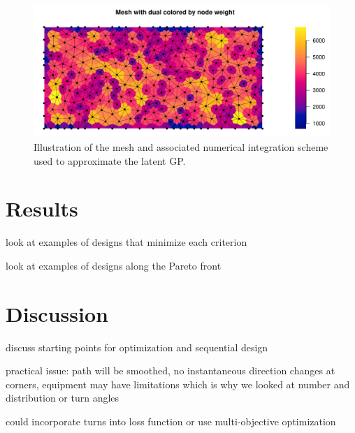 \documentclass[review]{elsarticle}
\begin{document}
\begin{figure}
\includegraphics[width=5in]{mesh_full.pdf}
\caption{Illustration of the mesh and associated numerical integration scheme
used to approximate the latent GP.}
\label{meshfull}
\end{figure}




\section{Results}

look at examples of designs that minimize each criterion

look at examples of designs along the Pareto front


\section{Discussion}

discuss starting points for optimization and sequential design

practical issue: path will be smoothed, no instantaneous direction changes at
corners, equipment may have limitations which is why we looked at number and
distribution or turn angles

could incorporate turns into loss function or use multi-objective
optimization~\citep{lark}
\end{document}
